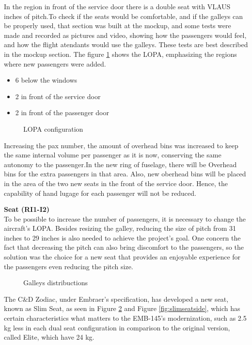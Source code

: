 In the region in front of the service door there is a double seat with VLAUS inches of pitch.To check if the seats would be comfortable, and if the galleys can be properly used, that section was built at the mockup, and some tests were made and recorded as pictures and video, showing how the passengers would feel, and how the flight atendants would use the galleys. These tests are best described in the mockup section.
The figure \ref{fig:LOPA} shows the LOPA, emphasizing the regions where new passengers were added.

\begin{itemize}
  \item 6 below the windows
  \item 2 in front of the service door
  \item 2 in front of the passenger door
\end{itemize}

\begin{figure}[H] %
\caption{LOPA configuration}
\label{fig:LOPA}
\end{figure}

Increasing the pax number, the amount of overhead bins was increased to keep the same internal volume per passenger as it is now, conserving the same autonomy to the passenger.In the new ring of fuselage, there will be Overhead bins for the extra passengers in that area. Also, new oberhead bins will be placed in the area of the two new seats in the front of the service door. Hence, the capability of hand lugage for each passenger will not be reduced.


\textbf{Seat (RI1-I2)}
\\
To be possible to increase the number of passengers, it is necessary to change the aircraft's LOPA. Besides resizing the galley, reducing the size of pitch from 31 inches to 29 inches is also needed to achieve the project's goal. One concern the fact that decreasing the pitch can also bring discomfort to the passengers, so the solution was the choice for a new seat that provides an enjoyable experience for the passengers even reducing the pitch size.

\begin{figure}[H]
\caption{Galleys distribuctions}
\label{fig:slimseatisometric}
\end{figure}

The C\&D Zodiac, under Embraer's specification, has developed a new seat, known as Slim Seat, as seen in Figure \ref{fig:slimseatisometric} and Figure \ref{fig:slimseatside}, which has certain characteristics what matters to the EMB-145's modernization, such as 2.5 kg less in each dual seat configuration in comparison to the original version, called Elite, which have 24 kg.

